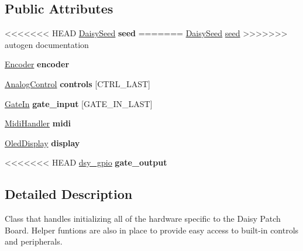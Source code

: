 \subsection*{Public Attributes}
\begin{DoxyCompactItemize}
\item 
<<<<<<< HEAD
\mbox{\label{classdaisy_1_1_daisy_patch_a4705ca24e5ebc4d8add7d83232162fd7}} 
\hyperlink{classdaisy_1_1_daisy_seed}{Daisy\+Seed} {\bfseries seed}
=======
\hyperlink{classdaisy_1_1_daisy_seed}{Daisy\+Seed} \hyperlink{classdaisy_1_1_daisy_patch_a4705ca24e5ebc4d8add7d83232162fd7}{seed}
>>>>>>> autogen documentation
\item 
\mbox{\label{classdaisy_1_1_daisy_patch_a4f9e8bfdf9607f95f2fd64003d70b25f}} 
\hyperlink{classdaisy_1_1_encoder}{Encoder} {\bfseries encoder}
\item 
\mbox{\label{classdaisy_1_1_daisy_patch_af2ad231a452402baa2df7a5fdbdf8a5b}} 
\hyperlink{classdaisy_1_1_analog_control}{Analog\+Control} {\bfseries controls} \mbox{[}C\+T\+R\+L\+\_\+\+L\+A\+ST\mbox{]}
\item 
\mbox{\label{classdaisy_1_1_daisy_patch_aa2a65b214c0c247dd246428962ccd060}} 
\hyperlink{classdaisy_1_1_gate_in}{Gate\+In} {\bfseries gate\+\_\+input} \mbox{[}G\+A\+T\+E\+\_\+\+I\+N\+\_\+\+L\+A\+ST\mbox{]}
\item 
\mbox{\label{classdaisy_1_1_daisy_patch_a3002495577219c839b2197a1d9439848}} 
\hyperlink{classdaisy_1_1_midi_handler}{Midi\+Handler} {\bfseries midi}
\item 
\mbox{\label{classdaisy_1_1_daisy_patch_a7e75f0c508d8272b6d40aae283639d31}} 
\hyperlink{classdaisy_1_1_oled_display}{Oled\+Display} {\bfseries display}
\item 
<<<<<<< HEAD
\mbox{\label{classdaisy_1_1_daisy_patch_a91a7d7e5aae230d58794b63c78f2cfda}} 
\hyperlink{structdsy__gpio}{dsy\+\_\+gpio} {\bfseries gate\+\_\+output}
\end{DoxyCompactItemize}


\subsection{Detailed Description}
Class that handles initializing all of the hardware specific to the Daisy Patch Board. Helper funtions are also in place to provide easy access to built-\/in controls and peripherals. 

